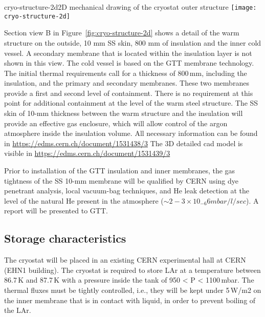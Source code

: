 \begin{cdrfigure}{cryo-structure-2d}{2D mechanical drawing of the cryostat outer structure}
  \texttt{[image: cryo-structure-2d]}
\end{cdrfigure}

Section view B in Figure~\ref{fig:cryo-structure-2d} shows a detail of the warm structure on the outside, 10 mm SS skin, 800 mm of insulation and the inner cold vessel. 
A secondary membrane that is located within the insulation layer is not shown in this view.  The cold vessel is based on the GTT membrane technology.   The initial thermal requirements 
 call for %
a thickness of 800\,mm, including the insulation, and the primary and secondary membranes. These two membranes provide a first and second level of containment. There is no requirement at this point for additional containment at the level of the warm steel structure. The SS skin of 10-mm thickness between the warm structure and the insulation will provide an effective gas enclosure, which will allow control of the argon atmosphere inside the insulation volume.
All necessary information can be found in \url{https://edms.cern.ch/document/1531438/3} 
The 3D detailed cad model is visible in \url{https://edms.cern.ch/document/1531439/3} 

Prior to installation of the GTT insulation and %
inner membranes, the gas tightness of the SS 10-mm membrane will be qualified  by CERN using dye penetrant analysis, local vacuum-bag techniques, and He leak %
detection at the level of the natural He present in the atmosphere ($\sim2-3 \times 10_{-6}6 mbar/l/sec$). A report will be presented to GTT.

\subsection{Storage characteristics}


The cryostat will be placed in an existing CERN experimental hall at CERN (EHN1 building). The 
cryostat is required to store LAr at a temperature between 86.7\,K and 87.7\,K with a pressure inside the 
tank of 950 < P < 1100\,mbar. %
The thermal fluxes must be tightly controlled, i.e., %
they will be kept under 5\,W/m2 on %
the inner membrane that is in contact with liquid, in order to prevent boiling of the LAr.


